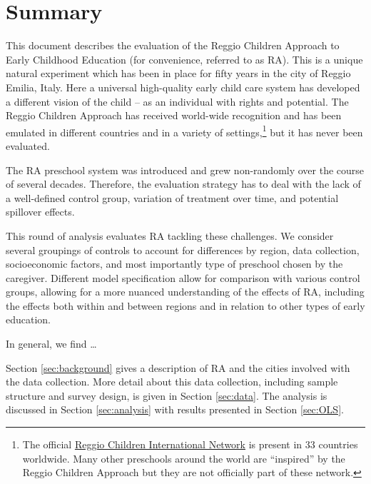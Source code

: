 \section{Summary}
This document describes the evaluation of the Reggio Children Approach to Early Childhood Education (for convenience, referred to as RA). This is a unique natural experiment which has been in place for fifty years in the city of
Reggio Emilia, Italy. Here a universal high-quality early child care system has developed a different
vision of the child – as an individual with rights and potential. The Reggio Children Approach has received
world-wide recognition and has been emulated in different countries and in a variety of settings,\footnote{The official \href{http://www.reggiochildren.it/network/?lang=en}{Reggio Children International Network} is present in 33 countries worldwide. Many other preschools around the world are ``inspired'' by the Reggio Children Approach but they are not officially part of these network.} but it has never been evaluated. 

The RA preschool system was introduced and grew non-randomly over the course of several decades. Therefore, the evaluation strategy has to deal with the lack of a well-defined control group, variation of treatment over time, and potential spillover effects. 

This round of analysis evaluates RA tackling these challenges. We consider several groupings of controls to account for differences by region, data collection, socioeconomic factors, and most importantly type of preschool chosen by the caregiver. %
Different model specification allow for comparison with various control groups, allowing for a more nuanced understanding of the effects of RA, including the effects both within and between regions and in relation to other types of early education.

In general, we find \ldots {}

Section \ref{sec:background} gives a description of RA and the cities involved with the data collection. More detail about this data collection, including sample structure and survey design, is given in Section \ref{sec:data}. The analysis is discussed in Section \ref{sec:analysis} with results presented in Section \ref{sec:OLS}.